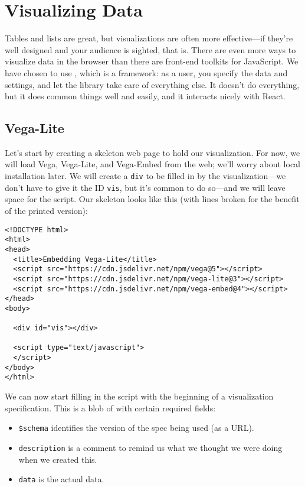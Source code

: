\chapter{Visualizing Data}\label{s:vis}

Tables and lists are great, but visualizations are often more effective---if
they're well designed and your audience is sighted, that is.
There are even more ways to visualize data in the browser
than there are front-end toolkits for JavaScript.
We have chosen to use ,
which is a  framework:
as a user,
you specify the data and settings,
and let the library take care of everything else.
It doesn't do everything,
but it does common things well and easily,
and it interacts nicely with React.

\section{Vega-Lite}\label{s:vis-vega-lite}

Let's start by creating a skeleton web page to hold our visualization.
For now, we will load Vega, Vega-Lite, and Vega-Embed from the web;
we'll worry about local installation later.
We will create a \texttt{div} to be filled in by the visualization---we
don't have to give it the ID \texttt{vis}, but it's common to do so---and
we will leave space for the script.
Our skeleton looks like this
(with lines broken for the benefit of the printed version):

\begin{verbatim}
<!DOCTYPE html>
<html>
<head>
  <title>Embedding Vega-Lite</title>
  <script src="https://cdn.jsdelivr.net/npm/vega@5"></script>
  <script src="https://cdn.jsdelivr.net/npm/vega-lite@3"></script>
  <script src="https://cdn.jsdelivr.net/npm/vega-embed@4"></script>
</head>
<body>

  <div id="vis"></div>

  <script type="text/javascript">
  </script>
</body>
</html>
\end{verbatim}

We can now start filling in the script with the beginning of a visualization specification.
This is a blob of  with certain required fields:

\begin{itemize}
\item
  \texttt{\$schema} identifies the version of the spec being used (as a URL).
\item
  \texttt{description} is a comment to remind us what we thought we were doing when we created this.
\item
  \texttt{data} is the actual data.
\end{itemize}

